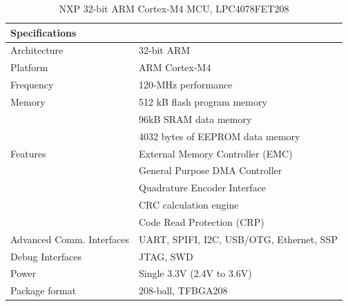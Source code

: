 \begin{table}
    \centering
    \caption{NXP 32-bit ARM Cortex-M4 MCU, LPC4078FET208 \autocite{alldatasheet.comLPC4078FET208DatasheetPDF}}
    \label{table:LPC4078FET208}%
    \begin{tabular}{|p{4cm}|p{12cm}|}
        \hline\rowcolor{gray!30}
    
        \textbf{Specifications} &  \\
        \hline
    
        Architecture & 32-bit ARM \\
        \hline
    
        Platform & ARM Cortex-M4 \\
        \hline
    
        Frequency & 120-MHz performance \\
        \hline
    
        Memory & 512 kB flash program memory \\
         & 96kB SRAM data memory \\
         & 4032 bytes of EEPROM data memory \\
        \hline

        Features & External Memory Controller (EMC) \\
         & General Purpose DMA Controller \\
         & Quadrature Encoder Interface \\
         & CRC calculation engine \\
         & Code Read Protection (CRP) \\
        \hline
    
        Advanced Comm. Interfaces & UART, SPIFI, I2C, USB/OTG, Ethernet, SSP \\
        \hline
    
        Debug Interfaces & JTAG, SWD \\
        \hline

        Power & Single 3.3V (2.4V to 3.6V) \\
        \hline
    
        Package format & 208-ball, TFBGA208 \\
        \hline
    
    \end{tabular}
\end{table}

